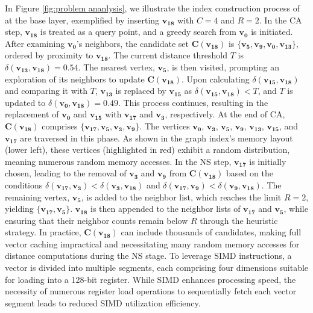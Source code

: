 \begin{myExa}
    \rm In Figure \ref{fig:problem ananlysis}, we illustrate the index construction process of  at the base layer, exemplified by inserting $\boldsymbol{v_{18}}$ with $C=4$ and $R=2$. In the CA step, $\boldsymbol{v_{18}}$ is treated as a query point, and a greedy search from $\boldsymbol{v_0}$ is initiated. After examining $\boldsymbol{v_0}$'s neighbors, the candidate set $\boldsymbol{C(v_{18})}$ is $\{\boldsymbol{v_5}, \boldsymbol{v_9}, \boldsymbol{v_0}, \boldsymbol{v_{13}} \}$, ordered by proximity to $\boldsymbol{v_{18}}$. The current distance threshold $T$ is $\delta(\boldsymbol{v_{13}}, \boldsymbol{v_{18}})=0.54$. The nearest vertex, $\boldsymbol{v_5}$, is then visited, prompting an exploration of its neighbors to update $\boldsymbol{C(v_{18})}$. Upon calculating $\delta(\boldsymbol{v_{15}}, \boldsymbol{v_{18}})$ and comparing it with $T$, $\boldsymbol{v_{13}}$ is replaced by $\boldsymbol{v_{15}}$ as $\delta( \boldsymbol{v_{15}}, \boldsymbol{v_{18}}) < T$, and $T$ is updated to $\delta(\boldsymbol{v_{0}}, \boldsymbol{v_{18}})=0.49$. This process continues, resulting in the replacement of $\boldsymbol{v_0}$ and $\boldsymbol{v_{15}}$ with $\boldsymbol{v_{17}}$ and $\boldsymbol{v_{3}}$, respectively. At the end of CA, $\boldsymbol{C(v_{18})}$ comprises $\{\boldsymbol{v_{17}}, \boldsymbol{v_5}, \boldsymbol{v_3}, \boldsymbol{v_{9}} \}$. The vertices $\boldsymbol{v_0}$, $\boldsymbol{v_3}$, $\boldsymbol{v_5}$, $\boldsymbol{v_9}$, $\boldsymbol{v_{13}}$, $\boldsymbol{v_{15}}$, and $\boldsymbol{v_{17}}$ are traversed in this phase. As shown in the graph index's memory layout (lower left), these vertices (highlighted in red) exhibit a random distribution, meaning numerous random memory accesses.
    In the NS step, $\boldsymbol{v_{17}}$ is initially chosen, leading to the removal of $\boldsymbol{v_3}$ and $\boldsymbol{v_9}$ from $\boldsymbol{C(v_{18})}$ based on the conditions $\delta(\boldsymbol{v_{17}},\boldsymbol{v_3}) < \delta(\boldsymbol{v_{3}},\boldsymbol{v_{18}})$ and $\delta(\boldsymbol{v_{17}},\boldsymbol{v_9}) < \delta(\boldsymbol{v_{9}},\boldsymbol{v_{18}})$. The remaining vertex, $\boldsymbol{v_5}$, is added to the neighbor list, which reaches the limit $R=2$, yielding $\{ \boldsymbol{v_{17}}, \boldsymbol{v_5}\}$. $\boldsymbol{v_{18}}$ is then appended to the neighbor lists of $\boldsymbol{v_{17}}$ and $\boldsymbol{v_5}$, while ensuring that their neighbor counts remain below $R$ through the heuristic strategy. In practice, $\boldsymbol{C(v_{18})}$ can include thousands of candidates, making full vector caching impractical and necessitating many random memory accesses for distance computations during the NS stage. To leverage SIMD instructions, a vector is divided into multiple segments, each comprising four dimensions suitable for loading into a 128-bit register. While SIMD enhances processing speed, the necessity of numerous register load operations to sequentially fetch each vector segment leads to reduced SIMD utilization efficiency.
\end{myExa}

